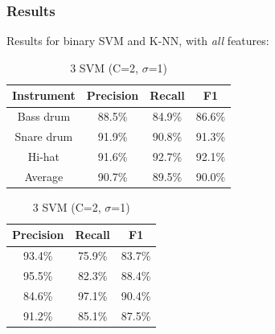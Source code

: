 \documentclass{beamer}
\begin{document}
    \begin{frame}
        \frametitle{Results}
        Results for binary SVM and K-NN, with \emph{all} features:
                \begin{center}
        \footnotesize 
        \begin{table}
        \parbox{.50\linewidth}{       
        \caption{3 K-NN (K=5)}
        \begin{tabular}{|c|c|c|c|}
        \hline
        Instrument&Precision&Recall&F1\\
        \hline
        Bass drum&88.5\%&84.9\%&86.6\%\\
        \hline
        Snare drum&91.9\%&90.8\%&91.3\%\\
        \hline
        Hi-hat&91.6\%&92.7\%&92.1\%\\
        \hline
        Average&90.7\%&89.5\%&90.0\%\\
        \hline
        \end{tabular}
        }
        \hfill
        \parbox{.40\linewidth}{
        \caption{3 SVM (C=2, $\sigma$=1)}
        \begin{tabular}{|c|c|c|}
        \hline
        Precision&Recall&F1\\
        \hline
        93.4\%&75.9\%&83.7\%\\
        \hline
        95.5\%&82.3\%&88.4\%\\
        \hline
        84.6\%&97.1\%&90.4\%\\
        \hline
        91.2\%&85.1\%&87.5\%\\
        \hline
        \end{tabular}
        }
        \end{table}  
        \end{center}
    \end{frame}
    
\end{document}
